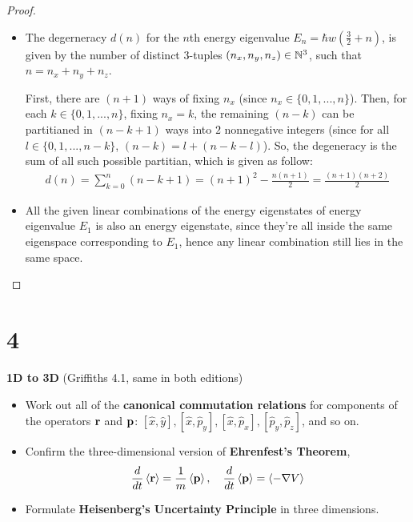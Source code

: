 \documentclass{article}
\begin{document}
\begin{proof}
\begin{itemize}
        \hfil

        \item[(b)] The degerneracy $d(n)$ for the $n$th energy eigenvalue $E_n = \hbar w\left(\frac{3}{2}+n\right)$, is given by the number of distinct $3$-tuples $(n_x,n_y,n_z)\in\mathbb{N}^3$, such that $n = n_x+n_y+n_z$.
        
        First, there are $(n+1)$ ways of fixing $n_x$ (since $n_x \in\{0,1,...,n\}$). Then, for each $k\in\{0,1,...,n\}$, fixing $n_x = k$, the remaining $(n-k)$ can be partitianed in $(n-k+1)$ ways into $2$ nonnegative integers (since for all $l\in\{0,1,...,n-k\}$, $(n-k) = l + (n-k-l)$). So, the degeneracy is the sum of all such possible partitian, which is given as follow:
        \begin{align}
            d(n) = \sum_{k=0}^n (n-k+1) = (n+1)^2 - \frac{n(n+1)}{2} = \frac{(n+1)(n+2)}{2}
        \end{align}

        \hfil

        \item[(c)]All the given linear combinations of the energy eigenstates of energy eigenvalue $E_1$ is also an energy eigenstate, since they're all inside the same eigenspace corresponding to $E_1$, hence any linear combination still lies in the same space. 
    \end{itemize}
\end{proof}

\newpage

\section*{4}

\begin{ques}\label{q4}
\textbf{1D to 3D} (Griffiths 4.1, same in both editions)

\begin{itemize}
    \item[(a)] Work out all of the \textbf{canonical commutation relations} for components of the operators $\mathbf{r}$ and $\mathbf{p}$: $[\hat{x},\hat{y}], [\hat{x},\hat{p}_y], [\hat{x},\hat{p}_x], [\hat{p}_y,\hat{p}_z]$, and so on.
    \item[(b)] Confirm the three-dimensional version of \textbf{Ehrenfest's Theorem},
    $$\frac{d}{dt}\left<\mathbf{r}\right> = \frac{1}{m}\left<\mathbf{p}\right>,\quad \frac{d}{dt}\left<\mathbf{p}\right> = \left<-\nabla V\right>$$
    \item[(c)] Formulate \textbf{Heisenberg's Uncertainty Principle} in three dimensions.
\end{itemize}
\end{ques}
\end{document}
